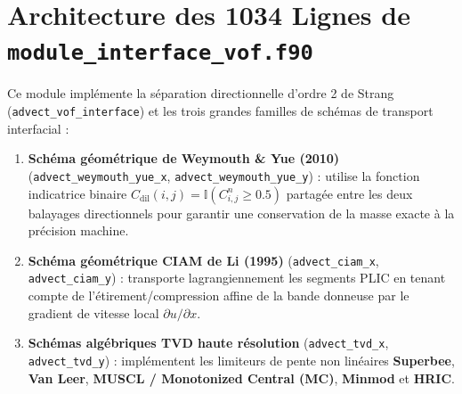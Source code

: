 \documentclass[10pt,a4paper,oneside]{book}
\begin{document}
\section{Architecture des 1034 Lignes de \texttt{module\_interface\_vof.f90}}
Ce module implémente la séparation directionnelle d'ordre 2 de Strang (\texttt{advect\_vof\_interface}) et les trois grandes familles de schémas de transport interfacial :
\begin{enumerate}
  \item \textbf{Schéma géométrique de Weymouth \& Yue (2010)} (\texttt{advect\_weymouth\_yue\_x}, \texttt{advect\_weymouth\_yue\_y}) : utilise la fonction indicatrice binaire $C_{\text{dil}}(i,j) = \mathbb{I}(C_{i,j}^n \ge 0.5)$ partagée entre les deux balayages directionnels pour garantir une conservation de la masse exacte à la précision machine.
  \item \textbf{Schéma géométrique CIAM de Li (1995)} (\texttt{advect\_ciam\_x}, \texttt{advect\_ciam\_y}) : transporte lagrangiennement les segments PLIC en tenant compte de l'étirement/compression affine de la bande donneuse par le gradient de vitesse local $\partial u / \partial x$.
  \item \textbf{Schémas algébriques TVD haute résolution} (\texttt{advect\_tvd\_x}, \texttt{advect\_tvd\_y}) : implémentent les limiteurs de pente non linéaires \textbf{Superbee}, \textbf{Van Leer}, \textbf{MUSCL / Monotonized Central (MC)}, \textbf{Minmod} et \textbf{HRIC}.
\end{enumerate}
\end{document}
